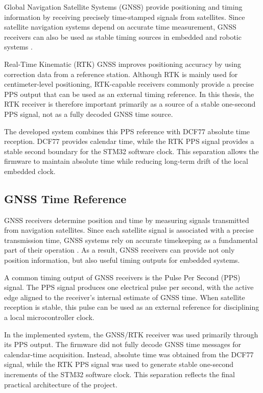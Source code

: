 Global Navigation Satellite Systems (GNSS) provide positioning and timing information by receiving precisely time-stamped signals from satellites. Since satellite navigation systems depend on accurate time measurement, GNSS receivers can also be used as stable timing sources in embedded and robotic systems \cite{teunissen2017springer}.

Real-Time Kinematic (RTK) GNSS improves positioning accuracy by using correction data from a reference station. Although RTK is mainly used for centimeter-level positioning, RTK-capable receivers commonly provide a precise PPS output that can be used as an external timing reference. In this thesis, the RTK receiver is therefore important primarily as a source of a stable one-second PPS signal, not as a fully decoded GNSS time source.

The developed system combines this PPS reference with DCF77 absolute time reception. DCF77 provides calendar time, while the RTK PPS signal provides a stable second boundary for the STM32 software clock. This separation allows the firmware to maintain absolute time while reducing long-term drift of the local embedded clock.

\subsection{GNSS Time Reference}

GNSS receivers determine position and time by measuring signals transmitted from navigation satellites. Since each satellite signal is associated with a precise transmission time, GNSS systems rely on accurate timekeeping as a fundamental part of their operation \cite{teunissen2017springer}. As a result, GNSS receivers can provide not only position information, but also useful timing outputs for embedded systems.

A common timing output of GNSS receivers is the Pulse Per Second (PPS) signal. The PPS signal produces one electrical pulse per second, with the active edge aligned to the receiver's internal estimate of GNSS time. When satellite reception is stable, this pulse can be used as an external reference for disciplining a local microcontroller clock.

In the implemented system, the GNSS/RTK receiver was used primarily through its PPS output. The firmware did not fully decode GNSS time messages for calendar-time acquisition. Instead, absolute time was obtained from the DCF77 signal, while the RTK PPS signal was used to generate stable one-second increments of the STM32 software clock. This separation reflects the final practical architecture of the project.

